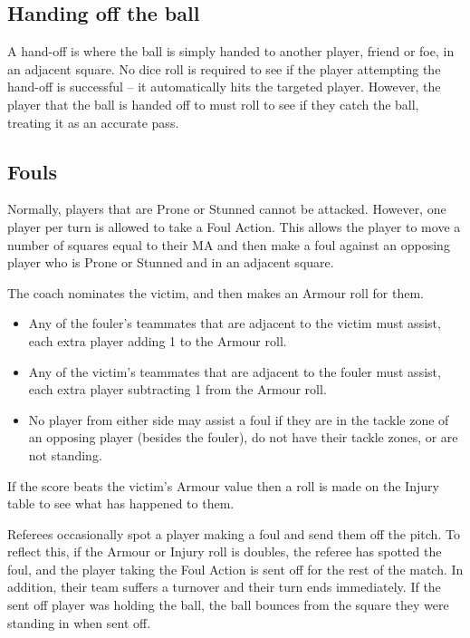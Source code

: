 \begin{multicols}{2}
\subsection{Handing off the ball}
\par A hand-off is where the ball is simply handed to another player, friend or foe, in an adjacent square. No dice roll is required to see if the player attempting the hand-off is successful -- it automatically hits the targeted player. However, the player that the ball is handed off to must roll to see if they catch the ball, treating it as an accurate pass.

\subsection{Fouls}
\par Normally, players that are Prone or Stunned cannot be attacked. However, one player per turn is allowed to take a Foul Action. This allows the player to move a number of squares equal to their MA and then make a foul against an opposing player who is Prone or Stunned and in an adjacent square.
\par The coach nominates the victim, and then makes an Armour roll for them.

\begin{itemize}
\item Any of the fouler's teammates that are adjacent to the victim must assist, each extra player adding 1 to the Armour roll.
\item Any of the victim's teammates that are adjacent to the fouler must assist, each extra player subtracting 1 from the Armour roll.
\item No player from either side may assist a foul if they are in the tackle zone of an opposing player (besides the fouler), do not have their tackle zones, or are not standing.
\end{itemize}

\par If the score beats the victim's Armour value then a roll is made on the Injury table to see what has happened to them.
\par Referees occasionally spot a player making a foul and send them off the pitch. To reflect this, if the Armour or Injury roll is doubles, the referee has spotted the foul, and the player taking the Foul Action is sent off for the rest of the match. In addition, their team suffers a turnover and their turn ends immediately. If the sent off player was holding the ball, the ball bounces from the square they were standing in when sent off.


\end{multicols}
